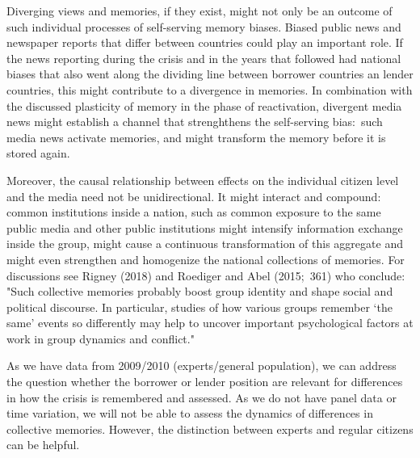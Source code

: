 Diverging views and memories, if they exist, might not only be an outcome of
such individual processes of self-serving memory biases. Biased public news
and newspaper reports that differ between countries could play an important
role. If the news reporting during the crisis and in the years that followed
had national biases that also went along the dividing line between borrower
countries an lender countries, this might contribute to a divergence in
memories. In combination with the discussed plasticity of memory in the
phase of reactivation, divergent media news might establish a channel that
strenghthens the self-serving bias:\ such media news activate memories, and
might transform the memory before it is stored again. 

Moreover, the causal relationship between effects on the individual citizen
level and the media need not be unidirectional. It might  interact and
compound: common institutions inside a nation, such as common exposure to
the same public media and other public institutions might intensify
information exchange inside the group, might cause a continuous
transformation of this aggregate and might even strengthen and homogenize
the national collections of memories. For discussions see Rigney (2018) and
Roediger and Abel (2015;\ 361) who conclude: "Such collective memories
probably boost group identity and shape social and political discourse. In
particular, studies of how various groups remember `the same' events so
differently may help to uncover important psychological factors at work in
group dynamics and conflict." 

As we have data from 2009/2010 (experts/general population), we can address
the question whether the borrower or lender position are relevant for
differences in how the crisis is remembered and assessed. As we do not have
panel data or time variation, we will not be able to assess the dynamics of
differences in collective memories. However, the distinction between experts
and regular citizens can be helpful. 
